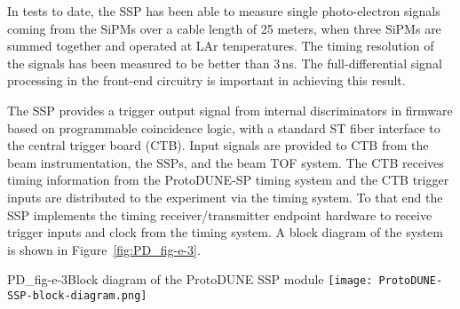 In tests to date, the SSP has been able to measure single photo-electron signals 
coming from the SiPMs over a cable length of 25 meters, when three SiPMs 
are summed together and operated at LAr temperatures.  
The timing resolution of the signals has been measured to be better than 3\,ns.  
The full-differential signal processing in the front-end circuitry 
is important in achieving this result.

The SSP provides a trigger output signal from internal discriminators in firmware based on programmable
coincidence logic, with a standard ST fiber interface to the central trigger board (CTB).
Input signals are provided to CTB from the beam instrumentation, the SSPs, and the beam TOF system.
The CTB receives timing information from the ProtoDUNE-SP timing system and the CTB trigger inputs are distributed to 
the experiment via the timing system.
To that end the SSP implements the timing receiver/transmitter endpoint hardware to receive trigger inputs and clock  from the timing system.
A block diagram of the system is shown in Figure~\ref{fig:PD_fig-e-3}.
%
\begin{cdrfigure}{PD_fig-e-3}{Block diagram of the ProtoDUNE SSP module} 
\texttt{[image: ProtoDUNE-SSP-block-diagram.png]}
\end{cdrfigure}
